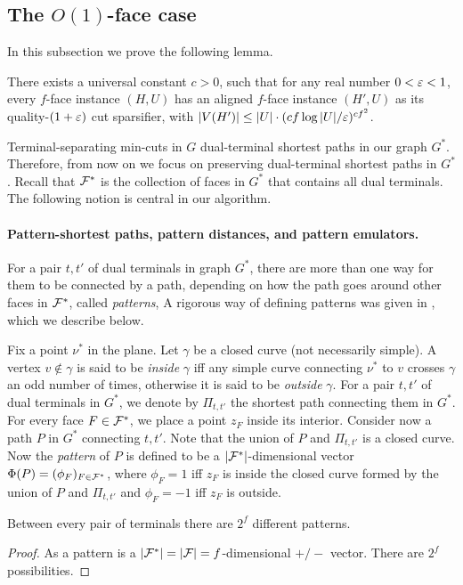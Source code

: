 \subsection{The $O(1)$-face case}

In this subsection we prove the following lemma.

\begin{lemma}
	\label{lem: O(1) face}
	There exists a universal constant $c>0$, such that for any real number $0<{\varepsilon}<1$, every $f$-face instance $(H,U)$ has an aligned $f$-face instance $(H',U)$ as its quality-$(1+{\varepsilon})$ cut sparsifier, with $|V(H')|\le |U|\cdot (cf\log |U|/{\varepsilon})^{cf^2}$.
\end{lemma}

Terminal-separating min-cuts in $G$ dual-terminal shortest paths in our graph $G^*$. Therefore, from now on we focus on preserving dual-terminal shortest paths in $G^*$. Recall that ${\mathcal{F}}^*$ is the collection of faces in $G^*$ that contains all dual terminals. The following notion is central in our algorithm.


\paragraph{Pattern-shortest paths, pattern distances, and pattern emulators.}
For a pair $t,t'$ of dual terminals in graph $G^*$, there are more than one way for them to be connected by a path, depending on how the path goes around other faces in ${\mathcal{F}}^*$, called \emph{patterns},  A rigorous way of defining patterns was given in \cite{krauthgamer2017refined}, which we describe below.

Fix a point $\nu^*$ in the plane.
Let $\gamma$ be a closed curve (not necessarily simple). A vertex $v\notin \gamma$ is said to be \emph{inside} $\gamma$ iff any simple curve connecting $\nu^*$ to $v$ crosses $\gamma$ an odd number of times, otherwise it is said to be \emph{outside} $\gamma$.
%
For a pair $t,t'$ of dual terminals in $G^*$, we denote by $\Pi_{t,t'}$ the shortest path connecting them in $G^*$.
For every face $F\in {\mathcal{F}}^*$, we place a point $z_F$ inside its interior. Consider now a path $P$ in $G^*$ connecting $t,t'$. Note that the union of $P$ and $\Pi_{t,t'}$ is a closed curve. Now the \emph{pattern} of $P$ is defined to be a $|{\mathcal{F}}^*|$-dimensional vector $\Phi(P)=(\phi_F)_{F\in {\mathcal{F}}^*}$, where $\phi_F=1$ iff $z_F$ is inside the closed curve formed by the union of $P$ and $\Pi_{t,t'}$ and $\phi_F=-1$ iff $z_F$ is outside.

\begin{observation}
\label{obs: pattern}
Between every pair of terminals there are $2^{f}$ different patterns.
\end{observation}
\begin{proof}
As a pattern is a $|{\mathcal{F}}^*|=|{\mathcal{F}}|=f$-dimensional $+/-$ vector. There are $2^f$ possibilities.
\end{proof}

